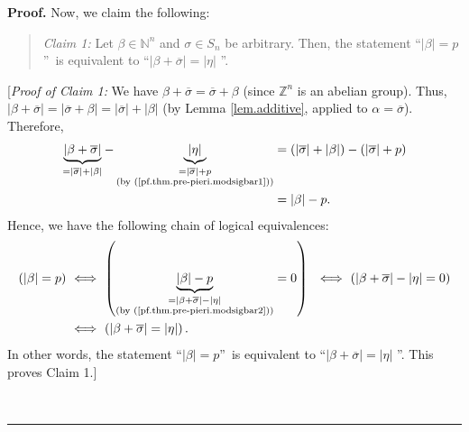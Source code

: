 \documentclass
[numbers=enddot,12pt,final,onecolumn,notitlepage,english]{scrartcl}%
\theoremstyle{definition}
\newenvironment{statement}{\begin{quote}}{\end{quote}}
\newenvironment{proof}[1][Proof]{\noindent\textbf{#1.} }{\ \rule{0.5em}{0.5em}}
\newenvironment{verlong}{}{}
\begin{document}
\begin{verlong}
\begin{proof}
Now, we claim the following:

\begin{statement}
\textit{Claim 1:} Let $\beta\in\mathbb{N}^{n}$ and $\sigma\in S_{n}$ be
arbitrary. Then, the statement \textquotedblleft$\left\vert \beta\right\vert
=p$\textquotedblright\ is equivalent to \textquotedblleft$\left\vert
\beta+\overline{\sigma}\right\vert =\left\vert \eta\right\vert $%
\textquotedblright.
\end{statement}

[\textit{Proof of Claim 1:} We have $\beta+\overline{\sigma}=\overline{\sigma
}+\beta$ (since $\mathbb{Z}^{n}$ is an abelian group). Thus, $\left\vert
\beta+\overline{\sigma}\right\vert =\left\vert \overline{\sigma}%
+\beta\right\vert =\left\vert \overline{\sigma}\right\vert +\left\vert
\beta\right\vert $ (by Lemma \ref{lem.additive}, applied to $\alpha
=\overline{\sigma}$). Therefore,%
\begin{align}
\underbrace{\left\vert \beta+\overline{\sigma}\right\vert }_{=\left\vert
\overline{\sigma}\right\vert +\left\vert \beta\right\vert }%
-\underbrace{\left\vert \eta\right\vert }_{\substack{=\left\vert
\overline{\sigma}\right\vert +p\\\text{(by (\ref{pf.thm.pre-pieri.modsigbar1}%
))}}}  &  =\left(  \left\vert \overline{\sigma}\right\vert +\left\vert
\beta\right\vert \right)  -\left(  \left\vert \overline{\sigma}\right\vert
+p\right) \nonumber\\
&  =\left\vert \beta\right\vert -p. \label{pf.thm.pre-pieri.modsigbar2}%
\end{align}
Hence, we have the following chain of logical equivalences:%
\begin{align*}
\left(  \left\vert \beta\right\vert =p\right)  \  &  \Longleftrightarrow
\ \left(  \underbrace{\left\vert \beta\right\vert -p}_{\substack{=\left\vert
\beta+\overline{\sigma}\right\vert -\left\vert \eta\right\vert \\\text{(by
(\ref{pf.thm.pre-pieri.modsigbar2}))}}}=0\right)  \ \ \Longleftrightarrow
\ \left(  \left\vert \beta+\overline{\sigma}\right\vert -\left\vert
\eta\right\vert =0\right) \\
&  \Longleftrightarrow\ \left(  \left\vert \beta+\overline{\sigma}\right\vert
=\left\vert \eta\right\vert \right)  .
\end{align*}
In other words, the statement \textquotedblleft$\left\vert \beta\right\vert
=p$\textquotedblright\ is equivalent to \textquotedblleft$\left\vert
\beta+\overline{\sigma}\right\vert =\left\vert \eta\right\vert $%
\textquotedblright. This proves Claim 1.] \medskip


\end{proof}
\end{verlong}
\end{document}
